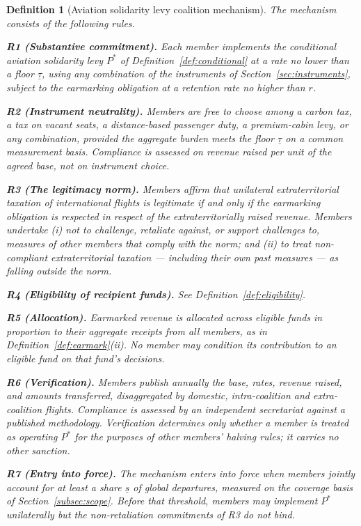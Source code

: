 \documentclass[11pt]{article}
\newtheorem{definition}{Definition}
\begin{document}
\begin{definition}[Aviation solidarity levy coalition mechanism]
\label{def:mechanism}
The mechanism consists of the following rules.

\medskip
\noindent\textbf{R1 (Substantive commitment).} Each member implements the
conditional aviation solidarity levy $P^{*}$ of
Definition~\ref{def:conditional} at a rate no lower than a floor $\underline\tau$,
using any combination of the instruments of Section~\ref{sec:instruments},
subject to the earmarking obligation at a retention rate no higher than $r$.

\medskip
\noindent\textbf{R2 (Instrument neutrality).} Members are free to choose among a
carbon tax, a tax on vacant seats, a distance-based passenger duty, a
premium-cabin levy, or any combination, provided the aggregate burden meets the
floor $\underline\tau$ on a common measurement basis. Compliance is assessed on
revenue raised per unit of the agreed base, not on instrument choice.

\medskip
\noindent\textbf{R3 (The legitimacy norm).} Members affirm that unilateral
extraterritorial taxation of international flights is legitimate if and only if
the earmarking obligation is respected in respect of the extraterritorially
raised revenue. Members undertake (i) not to challenge, retaliate against, or
support challenges to, measures of other members that comply with the norm; and
(ii) to treat non-compliant extraterritorial taxation --- including their own
past measures --- as falling outside the norm.

\medskip
\noindent\textbf{R4 (Eligibility of recipient funds).} See
Definition~\ref{def:eligibility}.

\medskip
\noindent\textbf{R5 (Allocation).} Earmarked revenue is allocated across
eligible funds in proportion to their aggregate receipts from all members, as in
Definition~\ref{def:earmark}(ii). No member may condition its contribution to an
eligible fund on that fund's decisions.

\medskip
\noindent\textbf{R6 (Verification).} Members publish annually the base, rates,
revenue raised, and amounts transferred, disaggregated by domestic,
intra-coalition and extra-coalition flights. Compliance is assessed by an
independent secretariat against a published methodology. Verification determines
only whether a member is treated as operating $P^{*}$ for the purposes of other
members' halving rules; it carries no other sanction.

\medskip
\noindent\textbf{R7 (Entry into force).} The mechanism enters into force when
members jointly account for at least a share $\underline{s}$ of global
departures, measured on the coverage basis of Section~\ref{subsec:scope}. Before
that threshold, members may implement $P^{*}$ unilaterally but the
non-retaliation commitments of R3 do not bind.


\end{definition}
\end{document}
